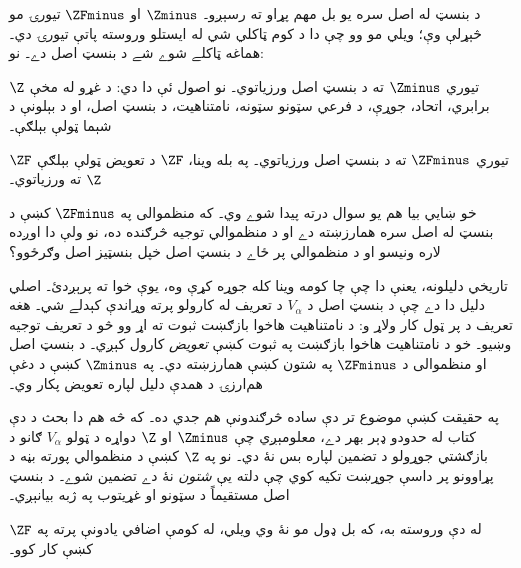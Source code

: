 \documentclass[../../../include/open-logic-section]{subfiles}
\begin{document}

د بنسټ له اصل سره يو بل مهم پړاو ته رسېږو۔ $\Zminus$ او $\ZFminus$
تيورۍ مو څېړلې وې؛ ويلي مو وو چې دا د کوم ټاکلي شي له ايستلو وروسته
پاتې تيورۍ دي۔ هماغه ټاکلے شوے شے د بنسټ اصل دے۔ نو:

\begin{defn}
$\Z$ تيوري $\Zminus$ ته د بنسټ اصل ورزياتوي۔ نو اصول ئې دا دي: د غړو
له مخې برابري، اتحاد، جوړې، د فرعي سټونو سټونه، نامتناهيت، د بنسټ اصل،
او د بېلونې د شېما ټولې بېلګې۔

$\ZF$ تيوري $\ZFminus$ ته د بنسټ اصل ورزياتوي۔ په بله وينا، $\ZF$
د تعويض ټولې بېلګې $\Z$ ته ورزياتوي۔
\end{defn}

خو ښايي بيا هم يو سوال درته پيدا شوے وي۔ که منظموالی په $\ZFminus$
کښې د بنسټ له اصل سره همارزښته دے او د منظموالي توجيه څرګنده ده، نو
ولې دا اوږده لاره ونيسو او د منظموالي پر ځاے د بنسټ اصل خپل بنسټيز
اصل وګرځوو؟

تاريخي دليلونه، يعنې دا چې چا کومه وينا کله جوړه کړې وه، يوې خوا ته
پرېږدئ۔ اصلي دليل دا دے چې د بنسټ اصل د $V_\alpha$ د تعريف له کارولو
پرته وړاندې کېدلے شي۔ هغه تعريف د  پر ټول کار
ولاړ و: د نامتناهيت هاخوا بازګښت ثبوت ته اړ وو څو د تعريف توجيه وښيو۔ خو
د نامتناهيت هاخوا بازګښت په ثبوت کښې \emph{تعويض} کارول کېږي۔
د بنسټ اصل او منظموالی د $\ZFminus$ په شتون کښې همارزښته دي۔
په $\Zminus$ کښې د دغې هم‌ارزۍ د همدې دليل لپاره تعويض پکار وي۔

په حقيقت کښې موضوع تر دې ساده څرګندونې هم جدي ده۔ که څه هم دا بحث
د دې کتاب له حدودو ډېر بهر دے، معلومېږي چې $\Zminus$ او $\Z$ دواړه
د ټولو $V_\alpha$ ګانو د بازګشتي جوړولو د تضمين لپاره بس نۀ دي۔
نو په $\Z$ کښې د منظموالي پورته بڼه د پړاوونو پر داسې
جوړښت تکيه کوي چې دلته يې \emph{شتون} نۀ دے تضمين شوے۔
د بنسټ اصل مستقيماً د سټونو او غړيتوب په ژبه بيانېږي۔

له دې وروسته به، که بل ډول مو نۀ وي ويلي، له کومې اضافي يادونې پرته
په $\ZF$ کښې کار کوو۔
\end{document}
